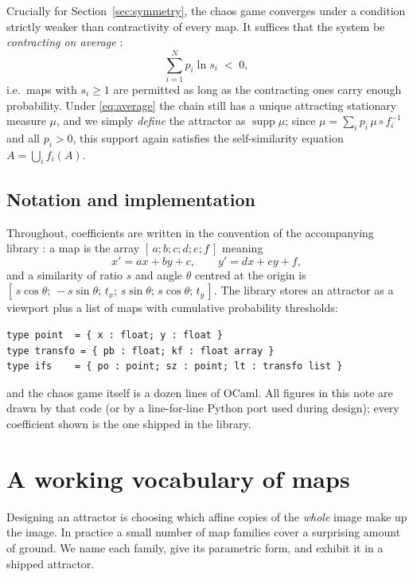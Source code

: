 \documentclass[11pt,a4paper]{article}
\theoremstyle{remark}
\begin{document}
Crucially for Section~\ref{sec:symmetry}, the chaos game converges under a
condition strictly weaker than contractivity of every map. It suffices that
the system be \emph{contracting on average} \cite{elton1987,
barnsleyelton1988}:
\begin{equation}
\label{eq:average}
\sum_{i=1}^{N} p_i \ln s_i \;<\; 0,
\end{equation}
i.e.\ maps with $s_i \ge 1$ are permitted as long as the contracting ones
carry enough probability. Under \eqref{eq:average} the chain still has a
unique attracting stationary measure $\mu$, and we simply \emph{define} the
attractor as $\operatorname{supp}\mu$; since $\mu = \sum_i p_i\,\mu\circ
f_i^{-1}$ and all $p_i>0$, this support again satisfies the self-similarity
equation $A = \bigcup_i f_i(A)$.

\subsection{Notation and implementation}

Throughout, coefficients are written in the convention of the accompanying
library \cite{ifsfractals2026}: a map is the array
$[\,a; b; c; d; e; f\,]$ meaning
\[
x' = a x + b y + c, \qquad y' = d x + e y + f,
\]
and a similarity of ratio $s$ and angle $\theta$ centred at the origin is
$[\,s\cos\theta;\, -s\sin\theta;\, t_x;\, s\sin\theta;\, s\cos\theta;\,
t_y\,]$. The library stores an attractor as a viewport plus a list of maps
with cumulative probability thresholds:

\begin{lstlisting}
type point  = { x : float; y : float }
type transfo = { pb : float; kf : float array }
type ifs    = { po : point; sz : point; lt : transfo list }
\end{lstlisting}

\noindent
and the chaos game itself is a dozen lines of OCaml. All figures in this
note are drawn by that code (or by a line-for-line Python port used during
design); every coefficient shown is the one shipped in the library.

\section{A working vocabulary of maps}
\label{sec:vocabulary}

Designing an attractor is choosing which affine copies of the \emph{whole}
image make up the image. In practice a small number of map families cover a
surprising amount of ground. We name each family, give its parametric form,
and exhibit it in a shipped attractor.
\end{document}
